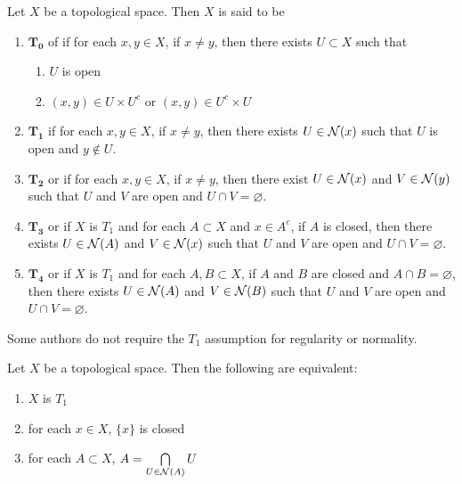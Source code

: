 \documentclass{book}
\begin{document}
	\begin{defn} 
		Let $X$ be a topological space. Then $X$ is said to be 
		\begin{enumerate}
			\item $\mathbf{T_0}$ of  if for each $x,y \in X$, if $x \neq y$, then there exists $U \subset X$ such that 
			\begin{enumerate}
				\item $U$ is open 
				\item $(x, y) \in U \times U^c$ or $(x,y) \in U^c \times U$
			\end{enumerate}
			\item $\mathbf{T_1}$ if for each $x,y \in X$, if $x \neq y$, then there exists $U \in \mathcal{N}(x)$ such that $U$ is open and $y \not \in U$.
			\item $\mathbf{T_2}$ or  if for each $x,y \in X$, if $x \neq y$, then there exist $U \in \mathcal{N}(x)$ and $V \in \mathcal{N}(y)$ such that $U$ and $V$ are open and $U \cap V = \varnothing$.
			\item $\mathbf{T_3}$ or  if $X$ is $T_1$ and for each $A \subset X$ and $x \in A^c$, if $A$ is closed, then there exists $U \in \mathcal{N}(A)$ and $V \in \mathcal{N}(x)$ such that $U$ and $V$ are open and $U \cap V = \varnothing$.
			\item $\mathbf{T_4}$ or  if $X$ is $T_1$ and for each $A,B \subset X$, if $A$ and $B$ are closed and $A \cap B = \varnothing$, then there exists $U \in \mathcal{N}(A)$ and $V \in \mathcal{N}(B)$ such that $U$ and $V$ are open and $U \cap V = \varnothing$.
		\end{enumerate}
	\end{defn}

	\begin{note}
		Some authors do not require the $T_1$ assumption for regularity or normality. 
	\end{note}

	\begin{ex} 
		Let $X$ be a topological space. Then the following are equivalent:
		\begin{enumerate}
			\item $X$ is $T_1$
			\item for each $x \in X$, $\{x\}$ is closed
			\item for each $A \subset X$, $A = \bigcap\limits_{U \in \mathcal{N}(A)} U$
		\end{enumerate}
	\end{ex}
	
\end{document}
